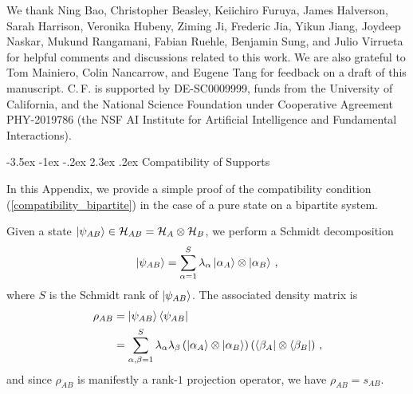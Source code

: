 \documentclass[12pt]{article}
\makeatletter
\renewcommand\section{\@startsection {section}{1}{\z@}%
                                   {-3.5ex \@plus -1ex \@minus -.2ex}%
                                   {2.3ex \@plus.2ex}%
                                   {\normalfont\large\bfseries}}
\numberwithin{equation}{section}
\makeatother
\begin{document}
We thank Ning Bao, Christopher Beasley, Keiichiro Furuya, James Halverson, Sarah Harrison, Veronika Hubeny, Ziming Ji, Frederic Jia, Yikun Jiang, Joydeep Naskar, Mukund Rangamani, Fabian Ruehle, Benjamin Sung, and Julio Virrueta for helpful comments and discussions related to this work. We are also grateful to Tom Mainiero, Colin Nancarrow, and Eugene Tang for feedback on a draft of this manuscript.
%
C.\,F. is supported by DE-SC0009999, funds from the University of California, and the National Science Foundation under Cooperative Agreement PHY-2019786 (the NSF AI Institute for Artificial Intelligence and Fundamental Interactions).



\appendix

\section{Compatibility of Supports}\label{app:compatibility}

In this Appendix, we provide a simple proof of the compatibility condition (\ref{compatibility_bipartite}) in the case of a pure state on a bipartite system.

Given a state $\ket{\psi_{AB}} \in \mathcal{H}_{AB} = \mathcal{H}_A \otimes \mathcal{H}_B$, we perform a Schmidt decomposition
%
\begin{align}
    \ket{ \psi_{AB} } = \sum_{\alpha = 1}^{S} \lambda_\alpha \ket{ \alpha_{A} } \otimes \ket{ \alpha_{B} } \, ,
\end{align}
%
where $S$ is the Schmidt rank of $\ket{ \psi_{AB} }$. The associated density matrix is
%
\begin{align}
    \rho_{AB} &= \ket{\psi_{AB}} \bra{\psi_{AB}} \nonumber \\
    &= \sum_{\alpha, \beta = 1}^{S} \lambda_\alpha \lambda_\beta \left( \ket{ \alpha_A } \otimes \ket{\alpha_B } \right) \left( \bra{\beta_A} \otimes \bra{\beta_B} \right) \, ,
\end{align}
%
and since $\rho_{AB}$ is manifestly a rank-$1$ projection operator, we have $\rho_{AB} = s_{AB}$.
\end{document}
